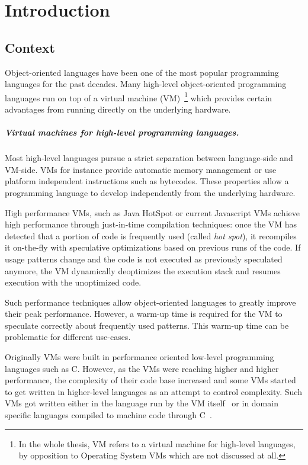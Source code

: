 \documentclass[a4paper,12pt,twoside]{../includes/ThesisStyle}
\begin{document}
\fi

\chapter{Introduction}
\label{chap:intro}
\minitoc

\section{Context}

Object-oriented languages have been one of the most popular programming languages for the past decades. Many high-level object-oriented programming languages run on top of a virtual machine (VM)~\footnote{In the whole thesis, VM refers to a virtual machine for high-level languages, by opposition to Operating System VMs which are not discussed at all.} which provides certain advantages from running directly on the underlying hardware. 

\paragraph{Virtual machines for high-level programming languages.}
Most high-level languages pursue a strict separation between language-side and VM-side. VMs for instance provide automatic memory management or use platform independent instructions such as bytecodes. These properties allow a programming language to develop independently from the underlying hardware.

High performance VMs, such as Java HotSpot or current Javascript VMs achieve high performance through just-in-time compilation techniques: once the VM has detected that a portion of code is frequently used (called \emph{hot spot}), it recompiles it on-the-fly with speculative optimizations based on previous runs of the code. If usage patterns change and the code is not executed as previously speculated anymore, the VM dynamically deoptimizes the execution stack and resumes execution with the unoptimized code.

Such performance techniques allow object-oriented languages to greatly improve their peak performance. However, a warm-up time is required for the VM to speculate correctly about frequently used patterns. This warm-up time can be problematic for different use-cases.

Originally VMs were built in performance oriented low-level programming languages such as C. However, as the VMs were reaching higher and higher performance, the complexity of their code base increased and some VMs started to get written in higher-level languages as an attempt to control complexity. Such VMs got written either in the language run by the VM itself~\cite{Unga05b,Wimm13a,Alp99a} or in domain specific languages compiled to machine code through C~\cite{Rigo06a,Inga97a}.
\end{document}
